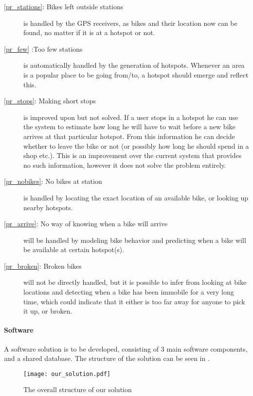 \begin{description}
\item[\ref{pr_stations}: Bikes left outside stations] is handled by the GPS receivers, as bikes and their location now can be found, no matter if it is at a hotspot or not.

\item[\ref{pr_few} :Too few stations] is automatically handled by the generation of hotspots.
Whenever an area is a popular place to be going from/to, a hotspot should emerge and reflect this.

\item[\ref{pr_stops}: Making short stops] is improved upon but not solved.
If a user stops in a hotspot he can use the system to estimate how long he will have to wait before a new bike arrives at that particular hotspot.
From this information he can decide whether to leave the bike or not (or possibly how long he should spend in a shop etc.).
This is an improvement over the current system that provides no such information, however it does not solve the problem entirely.

\item[\ref{pr_nobikes}: No bikes at station] is handled by locating the exact location of an available bike, or looking up nearby hotspots.

\item[\ref{pr_arrive}: No way of knowing when a bike will arrive] will be handled by modeling bike behavior and predicting when a bike will be available at certain hotspot(s).

\item[\ref{pr_broken}: Broken bikes] will not be directly handled, but it is possible to infer from looking at bike locations and detecting when a bike has been immobile for a very long time, which could indicate that it either is too far away for anyone to pick it up, or broken.
\end{description}

\paragraph{Software}
A software solution is to be developed, consisting of 3 main software components, and a shared database.
The structure of the solution can be seen in .

\begin{figure}[h]
\texttt{[image: our\_solution.pdf]}
\caption{The overall structure of our solution}
\label{fig:solution_structure}
\end{figure}

